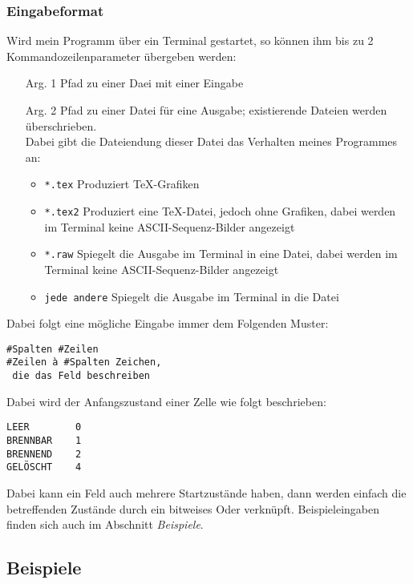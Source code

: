 \subsubsection{Eingabeformat}
Wird mein Programm über ein Terminal gestartet, so können ihm bis zu 2 Kommandozeilenparameter übergeben werden:
\begin{itemize}
\item[Arg. 1] Pfad zu einer Daei mit einer Eingabe
\item[Arg. 2] Pfad zu einer Datei für eine Ausgabe; existierende Dateien werden überschrieben.\\
Dabei gibt die Dateiendung dieser Datei das Verhalten meines Programmes an:
\begin{itemize}
\item \texttt{*.tex} Produziert TeX-Grafiken
\item \texttt{*.tex2} Produziert eine TeX-Datei, jedoch ohne Grafiken, dabei werden im Terminal keine ASCII-Sequenz-Bilder angezeigt
\item \texttt{*.raw} Spiegelt die Ausgabe im Terminal in eine Datei, dabei werden im Terminal keine ASCII-Sequenz-Bilder angezeigt
\item \texttt{jede andere} Spiegelt die Ausgabe im Terminal in die Datei
\end{itemize}
\end{itemize}

Dabei folgt eine mögliche Eingabe immer dem Folgenden Muster:

\begin{verbatim}
#Spalten #Zeilen
#Zeilen à #Spalten Zeichen,
 die das Feld beschreiben
\end{verbatim}

Dabei wird der Anfangszustand einer Zelle wie folgt beschrieben:
\begin{verbatim}
LEER		0
BRENNBAR	1
BRENNEND	2
GELÖSCHT	4
\end{verbatim}
Dabei kann ein Feld auch mehrere Startzustände haben, dann werden einfach die betreffenden Zustände durch ein bitweises Oder verknüpft.
Beispieleingaben finden sich auch im Abschnitt \emph{Beispiele}.

\subsection{Beispiele}
